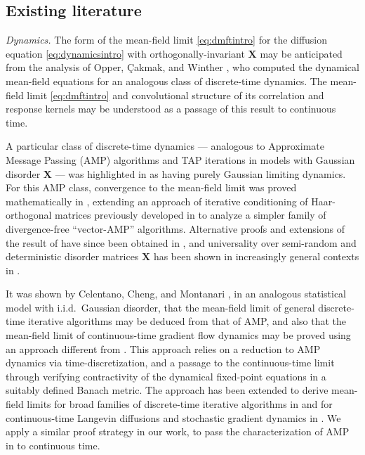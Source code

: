 \documentclass[11pt,letterpaper,reqno]{amsart}
\def\X{\mathbf{X}}
\theoremstyle{definition}
\numberwithin{equation}{section}
\begin{document}
\subsection{Existing literature} \emph{Dynamics.}
The form of the mean-field limit \eqref{eq:dmftintro} for the
diffusion equation \eqref{eq:dynamicsintro} with orthogonally-invariant $\X$
may be anticipated from the analysis of Opper,
\c{C}akmak, and Winther \cite{opper2016theory}, who computed the dynamical mean-field
equations for an analogous class of discrete-time dynamics.
The mean-field limit \eqref{eq:dmftintro} and convolutional structure of its
correlation and response kernels may be understood as a passage of this
result to continuous time.

A particular class of discrete-time dynamics --- analogous
to Approximate Message Passing (AMP) algorithms \cite{kabashima2003cdma,donoho2009message} and TAP iterations
\cite{bolthausen2014iterative} in models with Gaussian disorder $\X$ --- was highlighted in
\cite{opper2016theory} as having purely Gaussian limiting dynamics. For this AMP class,
convergence to the mean-field limit was proved mathematically in
\cite{fan2022approximate},
extending an approach of iterative conditioning of Haar-orthogonal matrices
previously developed in \cite{ma2017orthogonal,takeuchi2019rigorous,rangan2019vector} to analyze a simpler family of divergence-free
``vector-AMP'' algorithms. Alternative proofs and extensions of
the result of \cite{fan2022approximate} have since been obtained in \cite{liu2024unifying,gorini2026universality}, and universality
over semi-random and deterministic disorder matrices $\X$ has been shown
in increasingly general contexts in
\cite{dudeja2023universality,wang2024universality,gorini2026universality}.

It was shown by Celentano, Cheng, and Montanari \cite{celentano2021high}, in an analogous
statistical model with i.i.d.\ Gaussian disorder, that the
mean-field limit of  general discrete-time iterative algorithms may be
deduced from that of AMP, and also that the mean-field limit of
continuous-time gradient flow dynamics may be proved using an approach different
from \cite{arous1997symmetric,guionnet1997averaged}. This approach relies on a reduction to AMP dynamics via
time-discretization, and a passage to the continuous-time limit through
verifying contractivity of the dynamical
fixed-point equations in a suitably defined Banach metric.
The approach has been extended to derive mean-field limits for
broad families of discrete-time iterative algorithms in
\cite{gerbelot2024rigorous,han2025entrywise,celentano2025state,dandi2025sequential}
and for continuous-time Langevin diffusions and stochastic gradient dynamics 
in \cite{fan2025dynamicalI,fan2026high,nishiyama2026high}. We apply a similar proof strategy in our work, to pass the
characterization of AMP in \cite{fan2022approximate} to continuous time.
\end{document}
